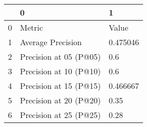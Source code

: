 \begin{tabular}{lll}
\toprule
{} &                       0 &         1 \\
\midrule
0 &                  Metric &     Value \\
1 &       Average Precision &  0.475046 \\
2 &  Precision at 05 (P@05) &       0.6 \\
3 &  Precision at 10 (P@10) &       0.6 \\
4 &  Precision at 15 (P@15) &  0.466667 \\
5 &  Precision at 20 (P@20) &      0.35 \\
6 &  Precision at 25 (P@25) &      0.28 \\
\bottomrule
\end{tabular}
